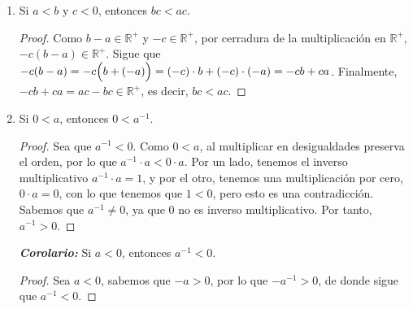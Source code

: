 \documentclass[11pt]{article}
\newcommand{\R}{\mathbb{R}}
\newcommand{\bfit}[1]{\textbf{\textit{#1}}}
\begin{document}
\begin{enumerate}[label=\alph*)]
    \item Si $a<b$ y $c<0$, entonces $bc<ac$.%
    
    \vspace{-1em}\begin{proof} 
    Como $b-a\in\R^+$ y $-c\in\R^+$, por cerradura de la multiplicación en $\R^+$, $-c(b-a) \in\R^+$. Sigue que $-c(b-a)= -c \Bigl( b + (-a) \Bigr)=(-c) \cdot b + (-c) \cdot (-a)=-cb +ca $. Finalmente, $-cb +ca=ac - bc \in\R^+$, es decir, $bc<ac$.    
    \end{proof} \vspace{-1em}

    \item Si $0<a$, entonces $0<a^{-1}$.%
    \vspace{-1em}\begin{proof} 
    Sea que $a^{-1}<0$. Como $0<a$, al multiplicar en desigualdades preserva el orden, por lo que $a^{-1} \cdot a<0 \cdot a$. Por un lado, tenemos el inverso multiplicativo $a^{-1} \cdot a = 1$, y por el otro, tenemos una multiplicación por cero, $0\cdot a=0$, con lo que tenemos que $1<0$, pero esto es una contradicción. Sabemos que $a^{-1}\neq 0$, ya que $0$ no es inverso multiplicativo. Por tanto, $a^{-1}>0$.
    \end{proof} \vspace{-1em}

    \bfit{Corolario:} Si $a<0$, entonces $a^{-1}<0$.%
    \vspace{-1em}
    \begin{proof}
    Sea $a<0$, sabemos que $-a>0$, por lo que $-a^{-1}>0$, de donde sigue que $a^{-1}<0$. \qedhere
    \end{proof} \vspace{-1em}


\end{enumerate}
\end{document}

